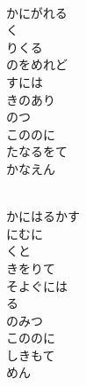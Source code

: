 \documentclass[10pt,b5j]{tarticle} %
\begin{document}
\vspace{1.5em} %
\newcommand{\linespace}{0.5em} %
\newcommand{\blocksize}{0.5\hsize} %
\newcommand{\itemmargin}{3em} %
\begin{enumerate} %
    \setlength{\itemindent}{\itemmargin} %
    \begin{minipage}[c]{\blocksize}
    
        \vspace{\linespace}
        \item~\\
        かにがれる\\
        く\\
        りくる\\
        のをめれど\\
        すには\\
        きのあり\\
        のつ\\
        こののに\\
        たなるをて\\
        かなえん
        
    \end{minipage}
    \begin{minipage}[c]{\blocksize}
        
        \vspace{\linespace}
        \item~\\
        かにはるかす\\
        にむに\\
        くと\\
        きをりて\\
        そよぐには\\
        る\\
        のみつ\\
        こののに\\
        しきもて\\
        めん
        

\end{minipage}
\end{enumerate}
\end{document}
